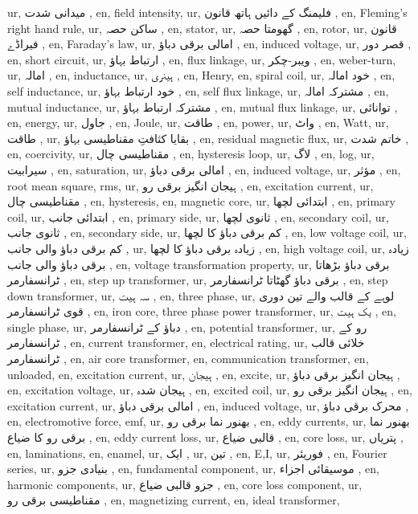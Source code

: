 ur, میدانی شدت ,
en, field intensity,
ur, فلیمنگ کے دائیں ہاتھ قانون ,
en, Fleming's right hand rule,
ur, ساکن حصہ ,
en, stator,
ur, گھومتا حصہ ,
en, rotor,
ur, قانون فیراڈے ,
en, Faraday's law,
ur, امالی برقی دباؤ ,
en, induced voltage,
ur, قصر دور ,
en, short circuit,
ur, ارتباط بہاؤ ,
en, flux linkage,
ur, ویبر-چکر ,
en, weber-turn,
ur, امالہ ,
en, inductance,
ur, ہینری ,
en, Henry,
en, spiral coil,
ur, خود امالہ ,
en, self inductance,
ur, خود ارتباط بہاؤ ,
en, self flux linkage,
ur, مشترکہ امالہ ,
en, mutual inductance,
ur, مشترکہ ارتباط بہاؤ ,
en, mutual flux linkage,
ur, توانائی ,
en, energy,
ur, جاول ,
en, Joule,
ur, طاقت ,
en, power,
ur, واٹ ,
en, Watt,
ur, طاقت ,
ur, بقایا کثافتِ مقناطیسی بہاؤ ,
en, residual magnetic flux,
ur, خاتم شدت ,
en, coercivity,
ur, مقناطیسی چال ,
en, hysteresis loop,
ur, لاگ ,
en, log,
ur, سیرابیت ,
en, saturation,
ur, امالی برقی دباؤ ,
en, induced voltage,
ur, مؤثر ,
en, root mean square, rms,
ur, ہیجان انگیز برقی رو ,
en, excitation current,
ur, مقناطیسی چال ,
en, hysteresis,
en, magnetic core,
ur, ابتدائی لچھا ,
en, primary coil,
ur, ابتدائی جانب ,
en, primary side,
ur, ثانوی لچھا ,
en, secondary coil,
ur, ثانوی جانب ,
en, secondary side,
ur, کم برقی دباؤ کا لچھا ,
en, low voltage coil,
ur, کم برقی دباؤ والی جانب ,
ur, زیادہ برقی دباؤ کا لچھا ,
en, high voltage coil,
ur, زیادہ برقی دباؤ والی جانب ,
en, voltage transformation property,
ur, برقی دباؤ بڑھاتا ٹرانسفارمر ,
en, step up transformer,
ur, برقی دباؤ گھٹاتا ٹرانسفارمر ,
en, step down transformer,
ur, سہ ہیت ,
en, three phase,
ur, لوہے کے قالب والے تین دوری قوی ٹرانسفارمر ,
en, iron core, three phase power transformer,
ur, یک ہیت ,
en, single phase,
ur, دباؤ کے ٹرانسفارمر ,
en, potential transformer,
ur, رو کے ٹرانسفارمر ,
en, current transformer,
en, electrical rating,
ur, خلائی قالب ٹرانسفارمر ,
en, air core transformer,
en, communication transformer,
en, unloaded,
en, excitation current,
ur, ہیجان ,
en, excite,
ur, ہیجان انگیز برقی دباؤ ,
en, excitation voltage,
ur, ہیجان شدہ ,
en, excited coil,
ur, ہیجان انگیز برقی رو ,
en, excitation current,
ur, امالی برقی دباؤ ,
en, induced voltage,
ur, محرک برقی دباؤ ,
en, electromotive force, emf,
ur, بھنور نما برقی رو ,
en, eddy currents,
ur, بھنور نما برقی رو کا ضیاع ,
en, eddy current loss,
ur, قالبی ضیاع ,
en, core loss,
ur, پتریاں ,
en, laminations,
en, enamel,
ur, ایک ,
ur, تین ,
en, E,I,
ur, فوریئر ,
en, Fourier series,
ur, بنیادی جزو ,
en, fundamental component,
ur, موسیقائی اجزاء ,
en, harmonic components,
ur, جزو قالبی ضیاع ,
en, core loss component,
ur, مقناطیسی برقی رو ,
en, magnetizing current,
en, ideal transformer,
